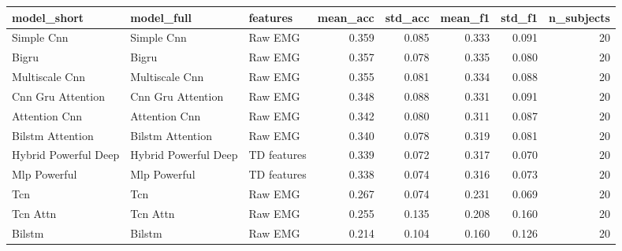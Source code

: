 \begin{tabular}{lllrrrrr}
\toprule
model_short & model_full & features & mean_acc & std_acc & mean_f1 & std_f1 & n_subjects \\
\midrule
Simple Cnn & Simple Cnn & Raw EMG & 0.359 & 0.085 & 0.333 & 0.091 & 20 \\
Bigru & Bigru & Raw EMG & 0.357 & 0.078 & 0.335 & 0.080 & 20 \\
Multiscale Cnn & Multiscale Cnn & Raw EMG & 0.355 & 0.081 & 0.334 & 0.088 & 20 \\
Cnn Gru Attention & Cnn Gru Attention & Raw EMG & 0.348 & 0.088 & 0.331 & 0.091 & 20 \\
Attention Cnn & Attention Cnn & Raw EMG & 0.342 & 0.080 & 0.311 & 0.087 & 20 \\
Bilstm Attention & Bilstm Attention & Raw EMG & 0.340 & 0.078 & 0.319 & 0.081 & 20 \\
Hybrid Powerful Deep & Hybrid Powerful Deep & TD features & 0.339 & 0.072 & 0.317 & 0.070 & 20 \\
Mlp Powerful & Mlp Powerful & TD features & 0.338 & 0.074 & 0.316 & 0.073 & 20 \\
Tcn & Tcn & Raw EMG & 0.267 & 0.074 & 0.231 & 0.069 & 20 \\
Tcn Attn & Tcn Attn & Raw EMG & 0.255 & 0.135 & 0.208 & 0.160 & 20 \\
Bilstm & Bilstm & Raw EMG & 0.214 & 0.104 & 0.160 & 0.126 & 20 \\
\bottomrule
\end{tabular}

